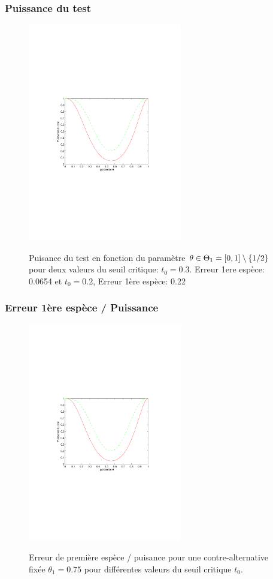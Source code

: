 \begin{frame}
\frametitle{Puissance du test}
\begin{figure}
  \centering
  \includegraphics[width=0.6\textwidth]{Puissance}\\
  \caption{Puisance du test en fonction du paramètre $\theta \in \Theta_1= \left[0,1\right]\setminus \{1/2\}$
  pour deux valeurs du seuil critique: $t_0=0.3$. Erreur 1ere espèce: 0.0654 et $t_0= 0.2$, Erreur 1ère espèce: 0.22 }
\end{figure}
\end{frame}

\begin{frame}
\frametitle{Erreur 1ère espèce / Puissance}
\begin{figure}
  \centering
  \includegraphics[width=0.6\textwidth]{Puissance}\\
  \caption{Erreur de première espèce / puisance pour une contre-alternative fixée $\theta_1=0.75$ pour différentes valeurs du seuil critique $t_0$. }
\end{figure}
\end{frame}

